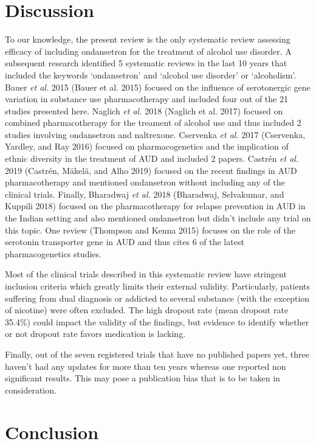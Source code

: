 \documentclass[
  12pt,
]{article}
\begin{document}
\section{Discussion}\label{discussion}

To our knowledge, the present review is the only systematic review
assessing efficacy of including ondansetron for the treatment of alcohol
use disorder. A subsequent research identified 5 systematic reviews in
the last 10 years that included the keywords `ondansetron' and `alcohol
use disorder' or `alcoholism'. Bauer \emph{et al.} 2015 (Bauer et al.
2015) focused on the influence of serotonergic gene variation in
substance use pharmacotherapy and included four out of the 21 studies
presented here. Naglich \emph{et al.} 2018 (Naglich et al. 2017) focused
on combined pharmacotherapy for the treament of alcohol use and thus
included 2 studies involving ondansetron and naltrexone. Cservenka
\emph{et al.} 2017 (Cservenka, Yardley, and Ray 2016) focused on
pharmacogenetics and the implication of ethnic diversity in the
treatment of AUD and included 2 papers. Castrén \emph{et al.} 2019
(Castrén, Mäkelä, and Alho 2019) focused on the recent findings in AUD
pharmacotherapy and mentioned ondansetron without including any of the
clinical trials. Finally, Bharadwaj \emph{et al.} 2018 (Bharadwaj,
Selvakumar, and Kuppili 2018) focused on the pharmacotherapy for relapse
prevention in AUD in the Indian setting and also mentioned ondansetron
but didn't include any trial on this topic. One review (Thompson and
Kenna 2015) focuses on the role of the serotonin transporter gene in AUD
and thus cites 6 of the latest pharmacogenetics studies.

Most of the clinical trials described in this systematic review have
stringent inclusion criteria which greatly limits their external
validity. Particularly, patients suffering from dual diagnosis or
addicted to several substance (with the exception of nicotine) were
often excluded. The high dropout rate (mean dropout rate 35.4\%) could
impact the validity of the findings, but evidence to identify whether or
not dropout rate favors medication is lacking.

Finally, out of the seven registered trials that have no published
papers yet, three haven't had any updates for more than ten years
whereas one reported non significant results. This may pose a
publication bias that is to be taken in consideration.

\section{Conclusion}\label{conclusion}
\end{document}
